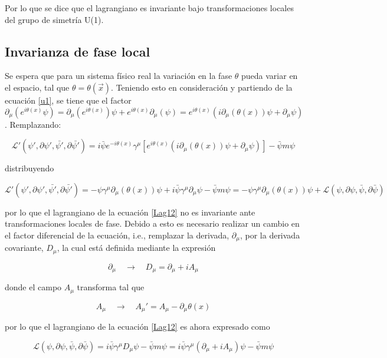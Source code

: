 Por lo que se dice que el lagrangiano es invariante bajo transformaciones locales del grupo de simetría U(1). 

\subsection{Invarianza de fase local}

Se espera que para un sistema físico real la variación en la fase $\theta$ pueda variar en el espacio, tal que $\theta=\theta(\vec{x})$. Teniendo esto en consideración y partiendo de la ecuación \ref{u1}, se tiene que el factor $\partial_{\mu} (e^{i\theta(x)}\psi) = \partial_{\mu} (e^{i\theta(x)})\psi + e^{i\theta(x)}\partial_{\mu} (\psi) = e^{i\theta(x)} (i\partial_{\mu}(\theta(x))\psi + \partial_{\mu}\psi)  $. Remplazando:

$$ \mathcal{L}' ( \psi', \partial \psi', \bar{\psi'}, \partial \bar{\psi'}) = i \bar{\psi}e^{-i\theta(x)}\gamma^{\mu}[e^{i\theta(x)}(i\partial_{\mu}(\theta(x))\psi + \partial_{\mu}\psi)]- \bar{\psi}m\psi $$

distribuyendo

$$ \mathcal{L}' ( \psi', \partial \psi', \bar{\psi'}, \partial \bar{\psi'}) = -\psi \gamma^{\mu}\partial_{\mu}(\theta(x))\psi + i \bar{\psi}\gamma^{\mu}\partial_{\mu}\psi - \bar{\psi}m\psi = -\psi \gamma^{\mu}\partial_{\mu}(\theta(x))\psi + \mathcal{L} ( \psi, \partial \psi, \bar{\psi}, \partial \bar{\psi}) $$

por lo que el lagrangiano de la ecuación \ref{Lag12} no es invariante ante transformaciones locales de fase. Debido a esto es necesario realizar un cambio en el factor diferencial de la ecuación, i.e., remplazar la derivada, $\partial_{\mu}$, por la derivada covariante, $D_{\mu}$, la cual está definida mediante la expresión

$$ \partial_{\mu} \quad \longrightarrow \quad D_{\mu} = \partial_{\mu} + iA_{\mu} $$

donde el campo $A_{\mu}$ transforma tal que

\begin{equation}
    A_{\mu} \quad \longrightarrow \quad A_{\mu}' = A_{\mu} - \partial_{\mu}\theta(x)
    \label{trab}
\end{equation}

por lo que el lagrangiano de la ecuación \ref{Lag12} es ahora expresado como

$$ \mathcal{L}(\psi, \partial \psi, \bar{\psi}, \partial\bar{\psi}) = i\bar{\psi}\gamma^{\mu}D_{\mu}\psi - \bar{\psi}m\psi = i\bar{\psi}\gamma^{\mu}(\partial_{\mu} + iA_{\mu})\psi - \bar{\psi}m\psi $$

